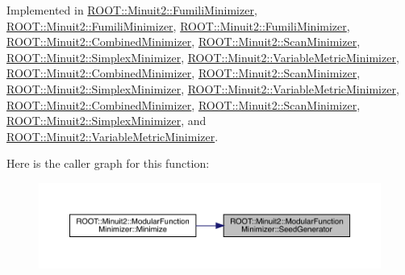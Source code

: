 Implemented in \mbox{\hyperlink{classROOT_1_1Minuit2_1_1FumiliMinimizer_ad8906dbac7f0c20284e361be606d5634}{R\+O\+O\+T\+::\+Minuit2\+::\+Fumili\+Minimizer}}, \mbox{\hyperlink{classROOT_1_1Minuit2_1_1FumiliMinimizer_ad8906dbac7f0c20284e361be606d5634}{R\+O\+O\+T\+::\+Minuit2\+::\+Fumili\+Minimizer}}, \mbox{\hyperlink{classROOT_1_1Minuit2_1_1FumiliMinimizer_ad8906dbac7f0c20284e361be606d5634}{R\+O\+O\+T\+::\+Minuit2\+::\+Fumili\+Minimizer}}, \mbox{\hyperlink{classROOT_1_1Minuit2_1_1CombinedMinimizer_a667ce6c321b6948d37087a2ac06be58c}{R\+O\+O\+T\+::\+Minuit2\+::\+Combined\+Minimizer}}, \mbox{\hyperlink{classROOT_1_1Minuit2_1_1ScanMinimizer_aaad34811cf2862cd8b66b634a1c9ba07}{R\+O\+O\+T\+::\+Minuit2\+::\+Scan\+Minimizer}}, \mbox{\hyperlink{classROOT_1_1Minuit2_1_1SimplexMinimizer_a7385d3ee5e4a48a796b11b51f7f0c408}{R\+O\+O\+T\+::\+Minuit2\+::\+Simplex\+Minimizer}}, \mbox{\hyperlink{classROOT_1_1Minuit2_1_1VariableMetricMinimizer_a8ac2123142283dd05611842236caeadb}{R\+O\+O\+T\+::\+Minuit2\+::\+Variable\+Metric\+Minimizer}}, \mbox{\hyperlink{classROOT_1_1Minuit2_1_1CombinedMinimizer_a667ce6c321b6948d37087a2ac06be58c}{R\+O\+O\+T\+::\+Minuit2\+::\+Combined\+Minimizer}}, \mbox{\hyperlink{classROOT_1_1Minuit2_1_1ScanMinimizer_aaad34811cf2862cd8b66b634a1c9ba07}{R\+O\+O\+T\+::\+Minuit2\+::\+Scan\+Minimizer}}, \mbox{\hyperlink{classROOT_1_1Minuit2_1_1SimplexMinimizer_a7385d3ee5e4a48a796b11b51f7f0c408}{R\+O\+O\+T\+::\+Minuit2\+::\+Simplex\+Minimizer}}, \mbox{\hyperlink{classROOT_1_1Minuit2_1_1VariableMetricMinimizer_a8ac2123142283dd05611842236caeadb}{R\+O\+O\+T\+::\+Minuit2\+::\+Variable\+Metric\+Minimizer}}, \mbox{\hyperlink{classROOT_1_1Minuit2_1_1CombinedMinimizer_a667ce6c321b6948d37087a2ac06be58c}{R\+O\+O\+T\+::\+Minuit2\+::\+Combined\+Minimizer}}, \mbox{\hyperlink{classROOT_1_1Minuit2_1_1ScanMinimizer_aaad34811cf2862cd8b66b634a1c9ba07}{R\+O\+O\+T\+::\+Minuit2\+::\+Scan\+Minimizer}}, \mbox{\hyperlink{classROOT_1_1Minuit2_1_1SimplexMinimizer_a7385d3ee5e4a48a796b11b51f7f0c408}{R\+O\+O\+T\+::\+Minuit2\+::\+Simplex\+Minimizer}}, and \mbox{\hyperlink{classROOT_1_1Minuit2_1_1VariableMetricMinimizer_a8ac2123142283dd05611842236caeadb}{R\+O\+O\+T\+::\+Minuit2\+::\+Variable\+Metric\+Minimizer}}.

Here is the caller graph for this function\+:
\nopagebreak
\begin{figure}[H]
\begin{center}
\leavevmode
\includegraphics[width=350pt]{d3/dc8/classROOT_1_1Minuit2_1_1ModularFunctionMinimizer_a742930de97b0ce9ba23773874ae0894b_icgraph}
\end{center}
\end{figure}


